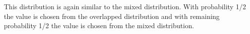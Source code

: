 This distribution is again similar to the mixed distribution.
With probability 1/2 the value is chosen from the overlapped distribution and with remaining probability 1/2 the value is chosen from the mixed distribution.
